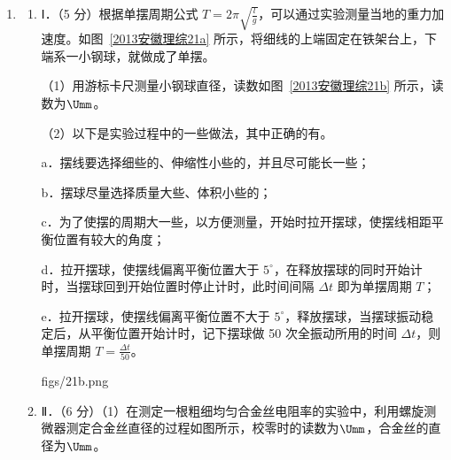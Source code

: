 \documentclass[\gkver]{gaokaozhenti}
\begin{document}
\begin{enumerate}

{$k\frac{4q}{9h^2}$}
{$k\frac{32q}{9h^2}$}
{$k\frac{40q}{9h^2}$}


\item
\begin{enumerate}
	\item
	Ⅰ．（5 分）根据单摆周期公式 $T=2\pi\sqrt{\frac{l}{g}}$，可以通过实验测量当地的重力加速度。如图~\ref{2013安徽理综21a} 所示，将细线的上端固定在铁架台上，下端系一小钢球，就做成了单摆。

	（1）用游标卡尺测量小钢球直径，读数如图~\ref{2013安徽理综21b} 所示，读数为$\Umm$。

	（2）以下是实验过程中的一些做法，其中正确的有。

	a．摆线要选择细些的、伸缩性小些的，并且尽可能长一些；

	b．摆球尽量选择质量大些、体积小些的；

	c．为了使摆的周期大一些，以方便测量，开始时拉开摆球，使摆线相距平衡位置有较大的角度；

	d．拉开摆球，使摆线偏离平衡位置大于 $5^{\circ}$，在释放摆球的同时开始计时，当摆球回到开始位置时停止计时，此时间间隔 $\Delta t$ 即为单摆周期 $T$；

	e．拉开摆球，使摆线偏离平衡位置不大于 $5^{\circ}$，释放摆球，当摆球振动稳定后，从平衡位置开始计时，记下摆球做 50 次全振动所用的时间 $\Delta t$，则单摆周期 $T=\frac{\Delta t}{50}$。

	{figs/21b.png}

	\item
	Ⅱ．（6 分）（1）在测定一根粗细均匀合金丝电阻率的实验中，利用螺旋测微器测定合金丝直径的过程如图所示，校零时的读数为$\Umm$，合金丝的直径为$\Umm$。


\end{enumerate}
\end{enumerate}
\end{document}
